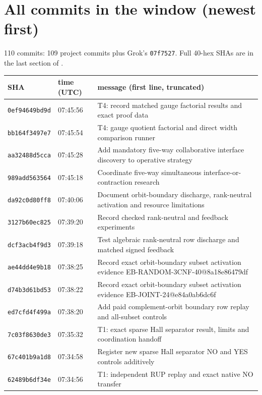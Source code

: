 \documentclass[11pt]{article}
\theoremstyle{remark}
\begin{document}
\section{All commits in the window (newest first)}\label{app:shas}
110 commits: 109 project commits plus Grok's \texttt{07f7527}. Full 40-hex SHAs are in
the last section of .
\begin{longtable}{lll}
\toprule
SHA & time (UTC) & message (first line, truncated)\\
\midrule
\endhead
\texttt{0ef94649bd9d} & 07:45:56 & {\footnotesize T4: record matched gauge factorial results and exact proof data}\\
\texttt{bb164f3497e7} & 07:45:54 & {\footnotesize T4: gauge quotient factorial and direct width comparison runner}\\
\texttt{aa32488d5cca} & 07:45:28 & {\footnotesize Add mandatory five-way collaborative interface discovery to operative strategy}\\
\texttt{989add563564} & 07:45:18 & {\footnotesize Coordinate five-way simultaneous interface-or-contraction research}\\
\texttt{da92c0d80ff8} & 07:40:06 & {\footnotesize Document orbit-boundary discharge, rank-neutral activation and resource limitations}\\
\texttt{3127b60ec825} & 07:39:20 & {\footnotesize Record checked rank-neutral and feedback experiments}\\
\texttt{dcf3acb4f9d3} & 07:39:18 & {\footnotesize Test algebraic rank-neutral row discharge and matched signed feedback}\\
\texttt{ae44dd4e9b18} & 07:38:25 & {\footnotesize Record exact orbit-boundary subset activation evidence EB-RANDOM-3CNF-40@8a18e86479df}\\
\texttt{d74b3d61bd53} & 07:38:22 & {\footnotesize Record exact orbit-boundary subset activation evidence EB-JOINT-24@e84a0ab6dc6f}\\
\texttt{ed7cfd4f499a} & 07:38:20 & {\footnotesize Add paid complement-orbit boundary row replay and all-subset controls}\\
\texttt{7c03f8630de3} & 07:35:32 & {\footnotesize T1: exact sparse Hall separator result, limits and coordination handoff}\\
\texttt{67c401b9a1d8} & 07:34:58 & {\footnotesize Register new sparse Hall separator NO and YES controls additively}\\
\texttt{62489b6df34e} & 07:34:56 & {\footnotesize T1: independent RUP replay and exact native NO transfer}\\

\end{longtable}
\end{document}
